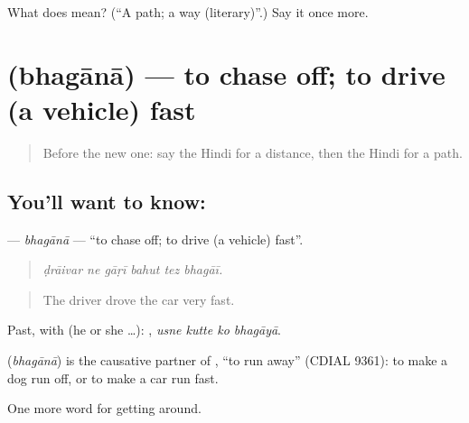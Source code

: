 \begin{tcolorbox}[breakable,colback=teal!4,colframe=teal!35!black,title={Before you move on}]
What does  mean? (\textquotedblleft{}A path; a way (literary)\textquotedblright{}.) Say it once more.
\end{tcolorbox}
\section[\texorpdfstring{\hi{भगाना} (bhagānā)}{भगाना (bhagānā)}]{ (bhagānā) — to chase off; to drive (a vehicle) fast}

\label{lesson:HI-C408-bhagana}



\begin{quote}
Before the new one: say the Hindi for a distance, then the Hindi for a path.
\end{quote}

\subsection*{You'll want to know: }
\textbf{} — \emph{bhagānā} — \textquotedblleft{}to chase off; to drive (a vehicle) fast\textquotedblright{}.

\begin{quote}
     
\end{quote}

\begin{quote}
\emph{ḍrāivar ne gāṛī bahut tez bhagāī.}
\end{quote}

\begin{quote}
The driver drove the car very fast.
\end{quote}

Past, with  (he or she …):    , \emph{usne kutte ko bhagāyā}.

\begin{cousinweb}
\textbf{} (\emph{bhagānā}) is the causative partner of , \textquotedblleft{}to run away\textquotedblright{} (CDIAL 9361): to make a dog run off, or to make a car run fast.
\end{cousinweb}

\begin{grammarlens}[title={What you've built}]
One more word for getting around.
\end{grammarlens}

